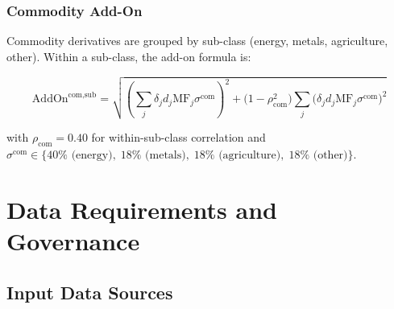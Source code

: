 \documentclass[11pt,a4paper]{article}
\begin{document}
\subsubsection{Commodity Add-On}

Commodity derivatives are grouped by sub-class (energy, metals, agriculture,
other). Within a sub-class, the add-on formula is:

\begin{equation}
  \text{AddOn}^{\text{com,sub}} = \sqrt{
    \left(\sum_j \delta_j d_j \text{MF}_j \sigma^{\text{com}}\right)^2
    + \bigl(1-\rho_{\text{com}}^2\bigr)
      \sum_j \bigl(\delta_j d_j \text{MF}_j \sigma^{\text{com}}\bigr)^2
  }
  \label{eq:com_addon}
\end{equation}

with $\rho_{\text{com}} = 0.40$ for within-sub-class correlation and
$\sigma^{\text{com}} \in \{40\%\text{ (energy)},\; 18\%\text{ (metals)},
\; 18\%\text{ (agriculture)},\; 18\%\text{ (other)}\}$.

\section{Data Requirements and Governance}

\subsection{Input Data Sources}
\end{document}
